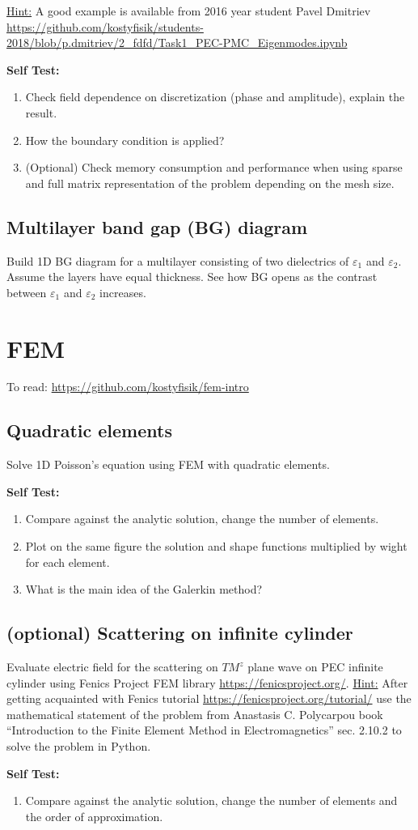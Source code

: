 \documentclass[11pt]{article}
\begin{document}
\underline{Hint:} A good example is available from 2016 year student
Pavel Dmitriev \url{https://github.com/kostyfisik/students-2018/blob/p.dmitriev/2_fdfd/Task1_PEC-PMC_Eigenmodes.ipynb}

\textbf{Self Test:}
\begin{enumerate}
\item Check field dependence on discretization (phase
  and amplitude), explain the result.
\item How the boundary condition is applied?
\item (Optional) Check memory consumption and performance when using sparse and full matrix representation of the problem depending on the mesh size.
\end{enumerate}

\subsection{Multilayer band gap (BG) diagram}
\label{sec:multilayer-band-gap}

Build 1D BG diagram for a multilayer consisting of two dielectrics of
$\varepsilon_1$ and $\varepsilon_2$. Assume the layers have equal
thickness. See how BG opens as the contrast between $\varepsilon_1$ and
$\varepsilon_2$ increases.

\section{FEM}

To read: \url{https://github.com/kostyfisik/fem-intro}

\subsection{Quadratic elements}
\label{sec:quadratic-elements}

Solve 1D Poisson's equation using FEM with quadratic elements. 

\textbf{Self Test:}
\begin{enumerate}
\item Compare against the analytic solution, change the number of elements.
\item Plot on the same figure the solution and shape functions multiplied by wight for each element. 
\item What is the main idea of the Galerkin method?
\end{enumerate}

\subsection{(optional) Scattering on infinite cylinder}
Evaluate electric field for the scattering on $TM^z$ plane wave on PEC infinite cylinder using Fenics Project FEM library \url{https://fenicsproject.org/}. \underline{Hint:} After getting acquainted with Fenics tutorial \url{https://fenicsproject.org/tutorial/} use the mathematical statement of the problem from  Anastasis C. Polycarpou book ``Introduction to the Finite Element Method in Electromagnetics'' sec. 2.10.2 to solve the problem in Python.

\textbf{Self Test:}
\begin{enumerate}
\item Compare against the analytic solution, change the number of elements and the order of approximation.
\end{enumerate}
\end{document}
